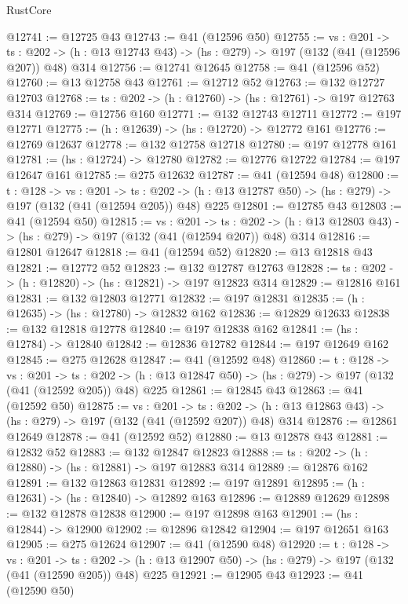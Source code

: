 \begin{lexlean}{RustCore}
\begin{coremodule}
@12741 := @12725 @43
@12743 := @41 (@12596 @50)
@12755 := {vs : @201} ->
  {ts : @202} -> (h : @13 @12743 @43) -> (hs : @279) -> @197 (@132 (@41 (@12596 @207)) @48) @314
@12756 := @12741 @12645
@12758 := @41 (@12596 @52)
@12760 := @13 @12758 @43
@12761 := @12712 @52
@12763 := @132 @12727 @12703
@12768 := {ts : @202} -> (h : @12760) -> (hs : @12761) -> @197 @12763 @314
@12769 := @12756 @160
@12771 := @132 @12743 @12711
@12772 := @197 @12771
@12775 := (h : @12639) -> (hs : @12720) -> @12772 @161
@12776 := @12769 @12637
@12778 := @132 @12758 @12718
@12780 := @197 @12778 @161
@12781 := (hs : @12724) -> @12780
@12782 := @12776 @12722
@12784 := @197 @12647 @161
@12785 := @275 @12632
@12787 := @41 (@12594 @48)
@12800 := {t : @128} ->
  {vs : @201} ->
  {ts : @202} -> (h : @13 @12787 @50) -> (hs : @279) -> @197 (@132 (@41 (@12594 @205)) @48) @225
@12801 := @12785 @43
@12803 := @41 (@12594 @50)
@12815 := {vs : @201} ->
  {ts : @202} -> (h : @13 @12803 @43) -> (hs : @279) -> @197 (@132 (@41 (@12594 @207)) @48) @314
@12816 := @12801 @12647
@12818 := @41 (@12594 @52)
@12820 := @13 @12818 @43
@12821 := @12772 @52
@12823 := @132 @12787 @12763
@12828 := {ts : @202} -> (h : @12820) -> (hs : @12821) -> @197 @12823 @314
@12829 := @12816 @161
@12831 := @132 @12803 @12771
@12832 := @197 @12831
@12835 := (h : @12635) -> (hs : @12780) -> @12832 @162
@12836 := @12829 @12633
@12838 := @132 @12818 @12778
@12840 := @197 @12838 @162
@12841 := (hs : @12784) -> @12840
@12842 := @12836 @12782
@12844 := @197 @12649 @162
@12845 := @275 @12628
@12847 := @41 (@12592 @48)
@12860 := {t : @128} ->
  {vs : @201} ->
  {ts : @202} -> (h : @13 @12847 @50) -> (hs : @279) -> @197 (@132 (@41 (@12592 @205)) @48) @225
@12861 := @12845 @43
@12863 := @41 (@12592 @50)
@12875 := {vs : @201} ->
  {ts : @202} -> (h : @13 @12863 @43) -> (hs : @279) -> @197 (@132 (@41 (@12592 @207)) @48) @314
@12876 := @12861 @12649
@12878 := @41 (@12592 @52)
@12880 := @13 @12878 @43
@12881 := @12832 @52
@12883 := @132 @12847 @12823
@12888 := {ts : @202} -> (h : @12880) -> (hs : @12881) -> @197 @12883 @314
@12889 := @12876 @162
@12891 := @132 @12863 @12831
@12892 := @197 @12891
@12895 := (h : @12631) -> (hs : @12840) -> @12892 @163
@12896 := @12889 @12629
@12898 := @132 @12878 @12838
@12900 := @197 @12898 @163
@12901 := (hs : @12844) -> @12900
@12902 := @12896 @12842
@12904 := @197 @12651 @163
@12905 := @275 @12624
@12907 := @41 (@12590 @48)
@12920 := {t : @128} ->
  {vs : @201} ->
  {ts : @202} -> (h : @13 @12907 @50) -> (hs : @279) -> @197 (@132 (@41 (@12590 @205)) @48) @225
@12921 := @12905 @43
@12923 := @41 (@12590 @50)

\end{coremodule}
\end{lexlean}
